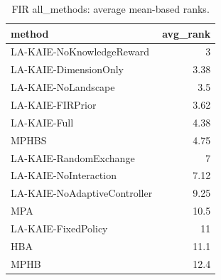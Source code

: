 \begin{table}[t]
\centering
\scriptsize
\caption{FIR all_methods: average mean-based ranks.}
\label{tab:fir_all_methods_ranks}
\begin{tabular}{lr}
\toprule
method & avg\_rank \\
\midrule
LA-KAIE-NoKnowledgeReward & 3 \\
LA-KAIE-DimensionOnly & 3.38 \\
LA-KAIE-NoLandscape & 3.5 \\
LA-KAIE-FIRPrior & 3.62 \\
LA-KAIE-Full & 4.38 \\
MPHBS & 4.75 \\
LA-KAIE-RandomExchange & 7 \\
LA-KAIE-NoInteraction & 7.12 \\
LA-KAIE-NoAdaptiveController & 9.25 \\
MPA & 10.5 \\
LA-KAIE-FixedPolicy & 11 \\
HBA & 11.1 \\
MPHB & 12.4 \\
\bottomrule
\end{tabular}
\end{table}
